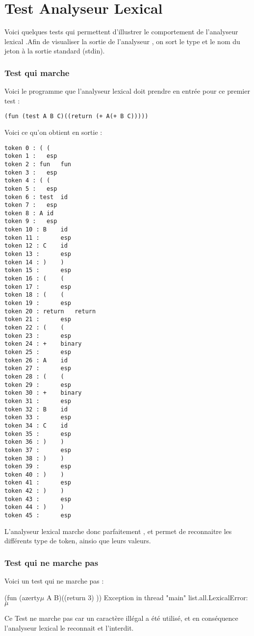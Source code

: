 \section{Test Analyseur Lexical}

Voici quelques tests qui permettent d'illustrer le comportement de l'analyseur lexical .Afin de visualiser la sortie de l'analyseur , on sort le type et le nom du jeton à la sortie standard (stdin).

\subsubsection{Test qui marche}
Voici le programme que l'analyseur lexical doit prendre en entrée pour ce premier test :
\begin{verbatim}
(fun (test A B C)((return (+ A(+ B C)))))
\end{verbatim}
Voici ce qu'on obtient en sortie :
{\tiny
\begin{verbatim}
token 0 : (	(
token 1 :  	esp
token 2 : fun	fun
token 3 :  	esp
token 4 : (	(
token 5 :  	esp
token 6 : test	id
token 7 :  	esp
token 8 : A	id
token 9 :  	esp
token 10 : B	id
token 11 :  	esp
token 12 : C	id
token 13 :  	esp
token 14 : )	)
token 15 :  	esp
token 16 : (	(
token 17 :  	esp
token 18 : (	(
token 19 :  	esp
token 20 : return	return
token 21 :  	esp
token 22 : (	(
token 23 :  	esp
token 24 : +	binary
token 25 :  	esp
token 26 : A	id
token 27 :  	esp
token 28 : (	(
token 29 :  	esp
token 30 : +	binary
token 31 :  	esp
token 32 : B	id
token 33 :  	esp
token 34 : C	id
token 35 :  	esp
token 36 : )	)
token 37 :  	esp
token 38 : )	)
token 39 :  	esp
token 40 : )	)
token 41 :  	esp
token 42 : )	)
token 43 :  	esp
token 44 : )	)
token 45 :  	esp
\end{verbatim}
}
L'analyseur lexical marche donc parfaitement , et permet de reconnaitre les différents type de token, ainsio que leurs valeurs.

\subsubsection{Test qui ne marche pas}

Voici un test qui ne marche pas :

(fun (azerty$\mu$ A B)((return 3) ))
Exception in thread "main" list.all.LexicalError: $\mu$


Ce Test ne marche pas car un caractère illégal a été utilisé, et en conséquence l'analyseur lexical le reconnait et l'interdit.

